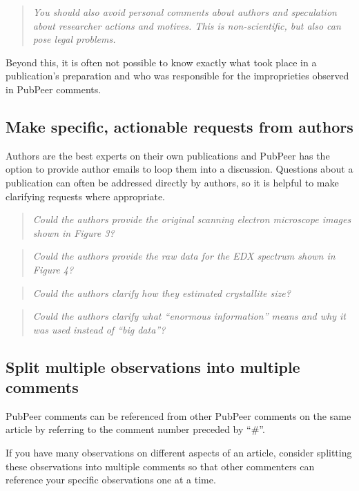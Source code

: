 \documentclass[letterpaper, 12pt]{article}
\begin{document}
\begin{quote}
    \textit{You should also avoid personal comments about authors and speculation about researcher actions and motives. This is non-scientific, but also can pose legal problems.}
\end{quote}

Beyond this, it is often not possible to know exactly what took place in a publication's preparation and who was responsible for the improprieties observed in PubPeer comments.

\subsection*{Make specific, actionable requests from authors}

Authors are the best experts on their own publications and PubPeer has the option to provide author emails to loop them into a discussion. Questions about a publication can often be addressed directly by authors, so it is helpful to make clarifying requests where appropriate.

\begin{quote}
    \textit{Could the authors provide the original scanning electron microscope images shown in Figure 3?}
\end{quote}

\begin{quote}
    \textit{Could the authors provide the raw data for the EDX spectrum shown in Figure 4?}
\end{quote}

\begin{quote}
    \textit{Could the authors clarify how they estimated crystallite size?}
\end{quote}

\begin{quote}
    \textit{Could the authors clarify what ``enormous information'' means and why it was used instead of ``big data''?}
\end{quote}

\subsection*{Split multiple observations into multiple comments}

PubPeer comments can be referenced from other PubPeer comments on the same article by referring to the comment number preceded by ``\#''.

If you have many observations on different aspects of an article, consider splitting these observations into multiple comments so that other commenters can reference your specific observations one at a time.
\end{document}
